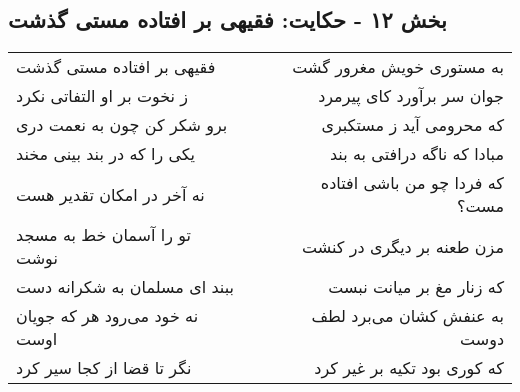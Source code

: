 \begin{center}
\section*{بخش ۱۲ - حکایت: فقیهی بر افتاده مستی گذشت}
\label{sec:012}
\begin{longtable}{l p{0.5cm} r}
فقیهی بر افتاده مستی گذشت
&&
به مستوری خویش مغرور گشت
\\
ز نخوت بر او التفاتی نکرد
&&
جوان سر برآورد کای پیرمرد
\\
برو شکر کن چون به نعمت دری
&&
که محرومی آید ز مستکبری
\\
یکی را که در بند بینی مخند
&&
مبادا که ناگه درافتی به بند
\\
نه آخر در امکان تقدیر هست
&&
که فردا چو من باشی افتاده مست؟
\\
تو را آسمان خط به مسجد نوشت
&&
مزن طعنه بر دیگری در کنشت
\\
ببند ای مسلمان به شکرانه دست
&&
که زنار مغ بر میانت نبست
\\
نه خود می‌رود هر که جویان اوست
&&
به عنفش کشان می‌برد لطف دوست
\\
نگر تا قضا از کجا سیر کرد
&&
که کوری بود تکیه بر غیر کرد
\\
\end{longtable}
\end{center}

